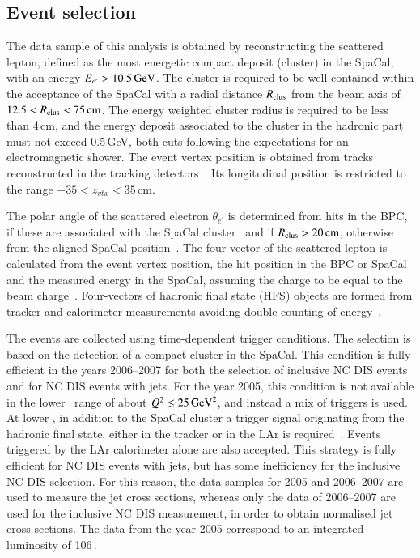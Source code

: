 \documentclass[12pt]{article}
\begin{document}
\subsection{Event selection}
\label{sec:event_sel_rec}
The data sample of this analysis is obtained by reconstructing the scattered lepton, 
defined as the most energetic compact deposit (cluster) in the SpaCal, with an energy  $E_{e^\prime}>10.5\,\GeV$.
The cluster is required to be well contained within the acceptance of the SpaCal with a radial distance 
$R_{\rm clus}$ from the beam axis of $12.5<R_{\rm clus}<75\,\rm{cm}$.
The energy weighted cluster radius 
is required to be less than 4\,cm, and the energy deposit
associated to the cluster in the hadronic part must not exceed 0.5\,GeV,
both cuts following the expectations for an electromagnetic shower.
The event vertex position is obtained from tracks reconstructed in the tracking detectors~\cite{brokenlines}.
Its longitudinal position is restricted to the range $-35<z_{vtx}<35$\,cm. 

The polar angle of the scattered electron $\theta_{e^\prime}$ is determined from hits in the BPC, 
if these are associated with the SpaCal cluster~\cite{FL} and if
$R_{\rm clus}>20\,{\rm cm}$, otherwise from the aligned SpaCal position~\cite{AaronQED}.
The four-vector of the scattered lepton is calculated from the event vertex position, 
the hit position in the BPC or SpaCal and the measured energy in the SpaCal,  
assuming the charge to be equal to the beam charge~\cite{AaronQED}.
Four-vectors of hadronic final state (HFS) objects are formed from 
tracker and calorimeter measurements avoiding double-counting of energy~\cite{Peez,Portheault}.

The events are collected using time-dependent trigger conditions. 
The selection is based on the detection of a compact cluster in the SpaCal. 
This condition is fully efficient in the years 2006--2007 for both the selection of inclusive NC DIS events and for NC DIS events with jets.
For the year 2005, this condition is not available in the lower \Qsq\ range of about $\Qsq\lesssim 25\,\GeVsq$, and instead a mix of triggers is used.
At lower \Qsq, in addition to the SpaCal cluster a trigger signal originating
from the hadronic final state, either in the tracker or in the LAr is required~\cite{FTT1,FTT2,FTT3}.
Events triggered by the LAr calorimeter alone are also accepted.
This strategy is fully efficient for NC DIS events with jets, but has some
inefficiency for the inclusive NC DIS selection.
For this reason, the data samples for 2005 and 2006--2007 are used to measure the jet cross sections,
whereas only the data of 2006--2007 are used for the inclusive NC DIS measurement, in order 
to obtain normalised jet cross sections.
The data from the year 2005 correspond to an integrated luminosity of 106\,\invpb.
\end{document}

